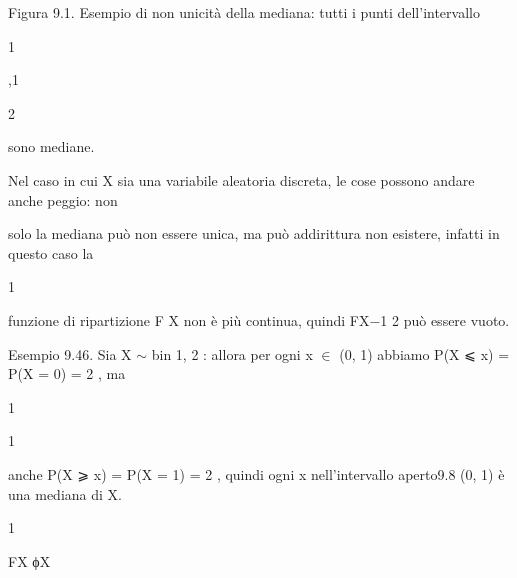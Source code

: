 \documentclass[a4paper,portrait,12pt]{article}
\begin{document}
\begin{flushleft}
Figura 9.1. Esempio di non unicit\`{a} della mediana: tutti i punti dell'intervallo
\end{flushleft}





1


,1


2





\begin{flushleft}
sono mediane.
\end{flushleft}





\begin{flushleft}
Nel caso in cui X sia una variabile aleatoria discreta, le cose possono andare anche peggio: non
\end{flushleft}


\begin{flushleft}
solo la mediana pu\`{o} non essere unica, ma pu\`{o} addirittura non esistere, infatti in questo caso la
\end{flushleft}


1


\begin{flushleft}
funzione di ripartizione F X non \`{e} più continua, quindi FX$-$1 2 pu\`{o} essere vuoto.
\end{flushleft}


\begin{flushleft}
Esempio 9.46. Sia X $\sim$ bin 1, 2 : allora per ogni x $\in$ (0, 1) abbiamo P(X ⩽ x) = P(X = 0) = 2 , ma
\end{flushleft}


1





1





\begin{flushleft}
anche P(X ⩾ x) = P(X = 1) = 2 , quindi ogni x nell'intervallo aperto9.8 (0, 1) \`{e} una mediana di X.
\end{flushleft}


1





\begin{flushleft}
FX ϕX
\end{flushleft}
\end{document}
